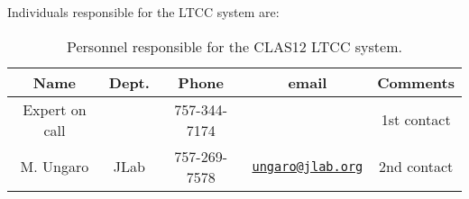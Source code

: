 Individuals responsible for the LTCC system are:

\begin{table}[!htb]
\centering
\begin{tabular}{|c|c|c|c|c|} \hline
Name           & Dept.& Phone        & email & Comments \\ \hline
Expert on call &      & 757-344-7174 &       & 1st contact \\ \hline
M. Ungaro      & JLab & 757-269-7578 &\href{mailto:ungaro@jlab.org}{\nolinkurl{ungaro@jlab.org}}&2nd contact \\ \hline
 \end{tabular}
\caption{Personnel responsible for the CLAS12 LTCC system.} 
\label{tb:ltcc}
\end{table}

